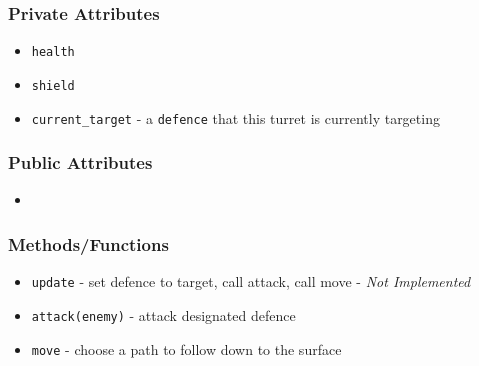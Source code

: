 \documentclass[12pt]{article}
\begin{document}
\subsubsection*{Private Attributes}
\begin{itemize}
\item \texttt{health}
\item \texttt{shield}
\item \texttt{current\_target} - a \texttt{defence} that this turret is
currently targeting
\end{itemize}
\subsubsection*{Public Attributes}
\begin{itemize}
\item 
\end{itemize}
\subsubsection*{Methods/Functions}
\begin{itemize}
\item \texttt{update} - set defence to target, call attack, call move - 
\textit{Not Implemented}
\item \texttt{attack(enemy)} - attack designated defence
\item \texttt{move} - choose a path to follow down to the surface
\end{itemize}
\end{document}
